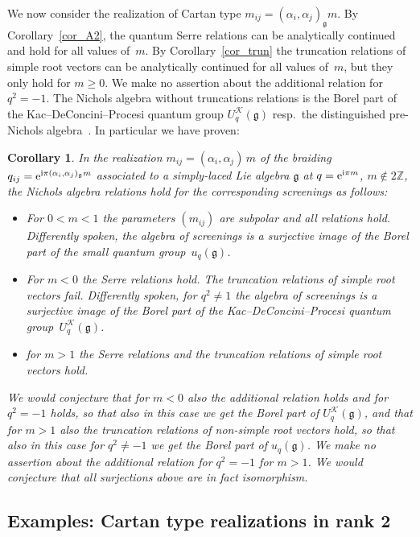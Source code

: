 \documentclass[pdftex]{sigma}%
\numberwithin{equation}{section}
\newtheorem{cor}[teo]{Corollary}
\newcommand{\Z}{\mathbb{Z}}
\renewcommand{\i}{\mathrm{i}}
\newcommand{\g}{\mathfrak{g}}
\begin{document}
We now consider the realization of Cartan type $m_{ij}=(\alpha_i,\alpha_j)_\g m$. By Corollary~\ref{cor_A2}, the quantum Serre relations can be analytically continued and hold for all values of~$m$. By Corollary~\ref{cor_trun} the truncation relations of simple root vectors can be analytically continued for all values of~$m$, but they only hold for $m\geq 0$. We make no assertion about the additional relation for $q^2=-1$. The Nichols algebra without truncations relations is the Borel part of the Kac--DeConcini--Procesi quantum group $U_q^\mathcal{K}(\g)$ resp.~the distinguished pre-Nichols algebra~\cite{Ang16}. In particular we have proven:
\begin{cor}In the realization $m_{ij}=(\alpha_i,\alpha_j)\,m$ of the braiding $q_{ij}={\rm e}^{\i\pi(\alpha_i,\alpha_j)_\g m}$ associated to a simply-laced Lie algebra $\g$ at $q={\rm e}^{{\rm i}\pi m}$, $m\not\in 2\Z$, the Nichols algebra relations hold for the corresponding screenings as follows:
	\begin{itemize}\itemsep=0pt
		\item For $0<m<1$ the parameters $(m_{ij})$ are subpolar and all relations hold. Differently spoken, the algebra of screenings is a surjective image of the Borel part of the small quantum group~$u_q(\g)$.
		\item For $m<0$ the Serre relations hold. The truncation relations of simple root vectors fail. Differently spoken, for $q^2\neq 1$ the algebra of screenings is a surjective image of the Borel part of the Kac--DeConcini--Procesi quantum group~$U_q^\mathcal{K}(\g)$.
		\item for $m>1$ the Serre relations and the truncation relations of simple root vectors hold.
	\end{itemize}
We would conjecture that for $m<0$ also the additional relation holds and for $q^2=-1$ holds, so that also in this case we get the Borel part of $U_q^\mathcal{K}(\g)$, and that for $m>1$ also the truncation relations of non-simple root vectors hold, so that also in this case for $q^2\neq -1$ we get the Borel part of $u_q(\g)$. We make no assertion about the additional relation for $q^2=-1$ for $m>1$.
	We would conjecture that all surjections above are in fact isomorphism.
\end{cor}

\subsection{Examples: Cartan type realizations in rank 2}
\end{document}
